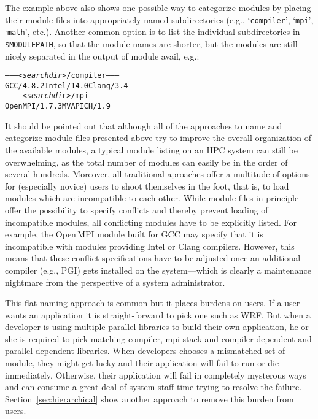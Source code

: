 The example above also shows one possible way to categorize modules by
placing their module files into appropriately named subdirectories (e.g.,
`\texttt{compiler}', `\texttt{mpi}', `\texttt{math}', etc.). Another common
option is to list the individual subdirectories in \texttt{\$MODULEPATH}, so
that the module names are shorter, but the modules are still nicely separated
in the output of module avail, e.g.:
{\small
\begin{alltt}
    % module avail
    -------- <\emph{searchdir}>/compiler --------
    GCC/4.8.2   Intel/14.0  Clang/3.4
    ---------- <s\emph{earchdi}r>/mpi -----------
    OpenMPI/1.7.3 MVAPICH/1.9
\end{alltt}
}

It should be pointed out that although all of the approaches to name and
categorize module files presented above try to improve the overall
organization of the available modules, a typical module listing on an HPC
system can still be overwhelming, as the total number of modules can easily
be in the order of several hundreds. Moreover, all traditional aproaches offer a
multitude of options for (especially novice) users to shoot themselves in the
foot, that is, to load modules which are incompatible to each other. While
module files in principle offer the possibility to specify conflicts and
thereby prevent loading of incompatible modules, all conflicting modules have
to be explicitly listed. For example, the Open\,MPI module built for GCC may
specify that it is incompatible with modules providing Intel or Clang
compilers. However, this means that these conflict specifications have to be
adjusted once an additional compiler (e.g., PGI) gets installed on the
system---which is clearly a maintenance nightmare from the perspective of a
system administrator.

This flat naming approach is common but it places burdens on users.
If a user wants an application it is straight-forward to pick one such
as WRF.  But when a developer is using multiple parallel libraries to
build their own application, he or she is required to pick matching
compiler, mpi stack and compiler dependent and parallel dependent
libraries.  When developers chooses a mismatched set of module, they
might get lucky and their application will fail to run or die
immediately.  Otherwise, their application will fail in completely
mysterous ways and can consume a great deal of system staff time
trying to resolve the failure.  Section~\ref{sec:hierarchical} show
another approach to remove this burden from users.



